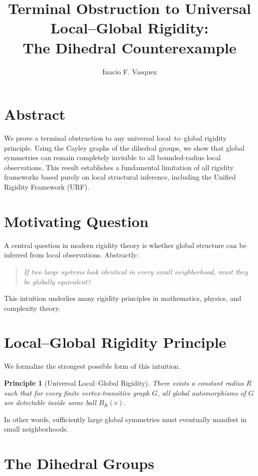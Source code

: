\documentclass[11pt]{article}
\title{Terminal Obstruction to Universal Local--Global Rigidity:\\
The Dihedral Counterexample}
\author{Inacio F. Vasquez}
\date{}
\newtheorem{principle}{Principle}
\begin{document}
\maketitle

\section*{Abstract}

We prove a terminal obstruction to any universal local--to--global rigidity
principle. Using the Cayley graphs of the dihedral groups, we show that
global symmetries can remain completely invisible to all bounded-radius
local observations. This result establishes a fundamental limitation of
all rigidity frameworks based purely on local structural inference,
including the Unified Rigidity Framework (URF).

\section{Motivating Question}

A central question in modern rigidity theory is whether global structure
can be inferred from local observations. Abstractly:

\begin{quote}
\emph{If two large systems look identical in every small neighborhood,
must they be globally equivalent?}
\end{quote}

This intuition underlies many rigidity principles in mathematics,
physics, and complexity theory.

\section{Local--Global Rigidity Principle}

We formalize the strongest possible form of this intuition.

\begin{principle}[Universal Local--Global Rigidity]
There exists a constant radius $R$ such that for every finite
vertex-transitive graph $G$, all global automorphisms of $G$ are
detectable inside some ball $B_R(v)$.
\end{principle}

In other words, sufficiently large global symmetries must eventually
manifest in small neighborhoods.

\section{The Dihedral Groups}
\end{document}

